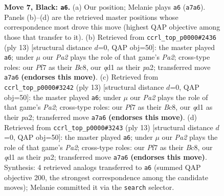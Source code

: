 \documentclass[11pt]{article}
\begin{document}
\begin{figure}[p]
\caption{\textbf{Move 7, Black: \texttt{a6}.} (a) Our position; Melanie plays \texttt{a6} (\texttt{a7a6}). Panels (b)--(d) are the retrieved master positions whose correspondence most drove this move (highest QAP objective among those that transfer to it). (b) Retrieved from \texttt{ccrl\_top\_p0000\#2436} (ply 13) [structural distance $d$=0, QAP obj=50]: the master played \texttt{a6}; under $\mu$ our \emph{Pa2} plays the role of that game's \emph{Pa2}; cross-type roles: our \emph{P}f7 as their \emph{B}c8, our \emph{q}d1 as their \emph{p}a2; transferred move \texttt{a7a6} \textbf{(endorses this move)}. (c) Retrieved from \texttt{ccrl\_top\_p0000\#3242} (ply 13) [structural distance $d$=0, QAP obj=50]: the master played \texttt{a6}; under $\mu$ our \emph{Pa2} plays the role of that game's \emph{Pa2}; cross-type roles: our \emph{P}f7 as their \emph{B}c8, our \emph{q}d1 as their \emph{p}a2; transferred move \texttt{a7a6} \textbf{(endorses this move)}. (d) Retrieved from \texttt{ccrl\_top\_p0000\#3243} (ply 13) [structural distance $d$=0, QAP obj=50]: the master played \texttt{a6}; under $\mu$ our \emph{Pa2} plays the role of that game's \emph{Pa2}; cross-type roles: our \emph{P}f7 as their \emph{B}c8, our \emph{q}d1 as their \emph{p}a2; transferred move \texttt{a7a6} \textbf{(endorses this move)}. Synthesis: 4 retrieved analogs transferred to \texttt{a6} (summed QAP objective 200, the strongest correspondence among the candidate moves); Melanie committed it via the \texttt{search} selector.}
\label{fig:thought-m13}
\end{figure}

\clearpage
\end{document}
